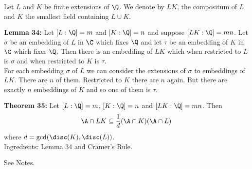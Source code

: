 Let $L$ and $K$ be finite extensions of $\Q$.  We denote by $LK$, the compositum of $L$ and $K$ the smallest field containing $L\cup K$.

\textbf{Lemma 34:} Let $[L:\Q]=m$ and $[K:\Q]=n$ and suppose $[LK:\Q]=mn$.  Let $\sigma$ be an embedding of $L$ in $\C$ which fixes $\Q$ and let $\tau$ be an embedding of $K$ in $\C$ which fixes $\Q$.  Then there is an embedding of $LK$ which when restricted to $L$ is $\sigma$ and when restricted to $K$ is $\tau$. \\
\pf For each embedding $\sigma$ of $L$ we can consider the extensions of $\sigma$ to embeddings of $LK$.  There are $n$ of them.  Restricted to $K$ there are $n$ again.  But there are exactly $n$ embeddings of $K$ and so one of them is $\tau$.

\textbf{Theorem 35:} Let $[L:\Q]=m$, $[K:\Q]=n$ and $[LK:\Q]=mn$.  Then 
\[ \A\cap LK \subseteq \frac{1}{d}(\A\cap K)(\A\cap L) \]
where $d=\gcd(\disc(K),\disc(L))$. \\
\pf Ingredients: Lemma 34 and Cramer's Rule.

See Notes.